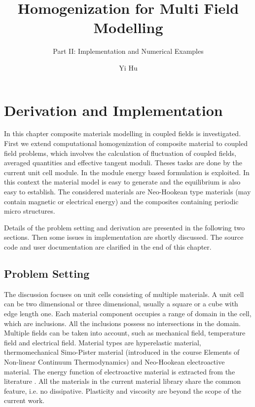 \documentclass[10pt,a4paper]{scrreprt}
\author{Yi Hu}
\title{Homogenization for Multi Field Modelling}
\subtitle{Part II: Implementation and Numerical Examples}
\begin{document}
\chapter{Derivation and Implementation}
In this chapter composite materials modelling in coupled fields is investigated. First we extend computational homogenization of composite material to coupled field problems, which involves the calculation of fluctuation of coupled fields, averaged quantities and effective tangent moduli. Theses tasks are done by the current unit cell module. In the module energy based formulation is exploited. In this context the material model is easy to generate and the equilibrium is also easy to establish. The considered materials are Neo-Hookean type materials (may contain magnetic or electrical energy) and the composites containing periodic micro structures.

Details of the problem setting and derivation are presented in the following two sections. Then some issues in implementation are shortly discussed. The source code and user documentation are clarified in the end of this chapter.

\section{Problem Setting}
The discussion focuses on unit cells consisting of multiple materials. A unit cell can be two dimensional or three dimensional, usually a square or a cube with edge length one. Each material component occupies a range of domain in the cell, which are inclusions. All the inclusions possess no intersections in the domain. Multiple fields can be taken into account, such as mechanical field, temperature field and electrical field. Material types are hyperelastic material, thermomechanical Simo-Pister material (introduced in the course Elements of Non-linear Continuum Thermodynamics) and Neo-Hookean electroactive material. The energy function of electroactive material is extracted from the literature \citep{keip_two-scale_2014}. All the materials in the current material library share the common feature, i.e. no dissipative. Plasticity and viscosity are beyond the scope of the current work.
\end{document}

